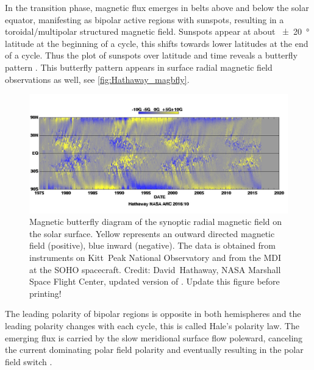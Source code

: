 In the transition phase, magnetic flux emerges in belts above and below the solar equator, manifesting as bipolar active regions with sunspots, resulting in a toroidal/multipolar structured magnetic field. Sunspots appear at about \SI{+-20}{\degree} latitude at the beginning of a cycle, this shifts towards lower latitudes at the end of a cycle. Thus the plot of sunspots over latitude and time reveals a butterfly pattern \citep{Maunder1904}. This butterfly pattern appears in surface radial magnetic field observations as well, see \autoref{fig:Hathaway_magbfly}.
\begin{figure}[htb]
	\centering
	\includegraphics[width=\textwidth]{images/Hathaway_magbfly_201610.jpg}
	\caption{Magnetic butterfly diagram of the synoptic radial magnetic field on the solar surface. Yellow represents an outward directed magnetic field (positive), blue inward (negative). The data is obtained from instruments on Kitt~Peak National Observatory and from the MDI at the SOHO spacecraft. Credit: David~Hathaway, NASA Marshall Space Flight Center, updated version of \citet[][Fig.~17]{Hathaway2015}. Update this figure before printing!}
	\label{fig:Hathaway_magbfly}
\end{figure}
The leading polarity of bipolar regions is opposite in both hemispheres and the leading polarity changes with each cycle, this is called Hale's polarity law. The emerging flux is carried by the slow meridional surface flow poleward, canceling the current dominating polar field polarity and eventually resulting in the polar field switch \citep{Hathaway2015}.

